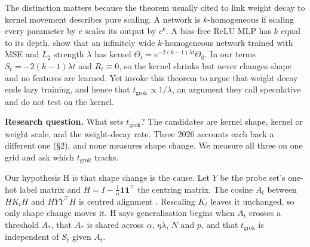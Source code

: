 \documentclass[a4paper,11pt]{article} %
\newcommand{\tgrok}{t_{\mathrm{grok}}}
\begin{document}
The distinction matters because the theorem usually cited to link weight
decay to kernel movement describes pure scaling. A network is $k$-homogeneous
if scaling every parameter by $c$ scales its output by $c^k$. A bias-free ReLU
MLP has $k$ equal to its depth. \citet[Thms.~1--2]{lewkowycz2020l2} show that
an infinitely wide $k$-homogeneous network trained with MSE and $L_2$
strength $\lambda$ has kernel $\Theta_t=e^{-2(k-1)\lambda t}\Theta_0$.
In our terms $S_t=-2(k-1)\lambda t$ and $R_t\equiv0$, so the kernel shrinks but
never changes shape and no features are learned. Yet
\citet[App.~13, arXiv v3]{kumar2024grokking} invoke this theorem to argue that
weight decay ends lazy training, and hence that $\tgrok\propto1/\lambda$, an argument
they call speculative and do not test on the kernel.

\textbf{Research question.} What sets $\tgrok$? The candidates are kernel
shape, kernel or weight scale, and the weight-decay rate.
Three 2026 accounts each back a different one (\S2), and none measures
shape change. We measure all three on one grid and ask which $\tgrok$ tracks.

Our hypothesis H is that shape change is the cause. Let $Y$ be the probe set's
one-hot label matrix and $H=I-\tfrac1n\mathbf{1}\mathbf{1}^\top$ the centring
matrix. The cosine $A_t$ between $HK_tH$ and $HYY^\top H$ is centred
alignment \citep{cortes2012alignment}. Rescaling $K_t$ leaves it
unchanged, so only shape change moves it. H says generalisation begins when $A_t$ crosses a
threshold $A_*$, that $A_*$ is shared across $\alpha$, $\eta\lambda$, $N$ and
$p$, and that $\tgrok$ is independent of $S_t$ given $A_t$.


\end{document}
